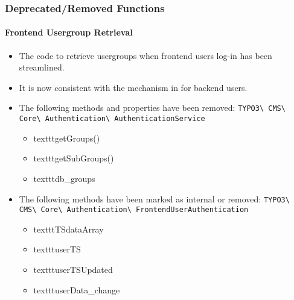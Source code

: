 %

\begin{frame}[fragile]
	\frametitle{Deprecated/Removed Functions}
	\framesubtitle{Frontend Usergroup Retrieval}

	\begin{itemize}
		\item The code to retrieve usergroups when frontend users log-in has been
			streamlined.
		\item It is now consistent with the mechanism in for backend users.
		\item The following methods and properties have been removed:\newline
			\smaller\texttt{TYPO3\textbackslash
				CMS\textbackslash
				Core\textbackslash
				Authentication\textbackslash
				AuthenticationService}\normalsize

			\begin{itemize}\smaller
				\item texttt{getGroups()}
				\item texttt{getSubGroups()}
				\item texttt{db\_groups}
			\end{itemize}\normalsize

		\item The following methods have been marked as internal or removed:\newline
			\smaller\texttt{TYPO3\textbackslash
				CMS\textbackslash
				Core\textbackslash
				Authentication\textbackslash
				FrontendUserAuthentication}\normalsize

			\begin{itemize}\smaller
				\item texttt{TSdataArray}
				\item texttt{userTS}
				\item texttt{userTSUpdated}
				\item texttt{userData\_change}
			\end{itemize}\normalsize

	\end{itemize}

\end{frame}

